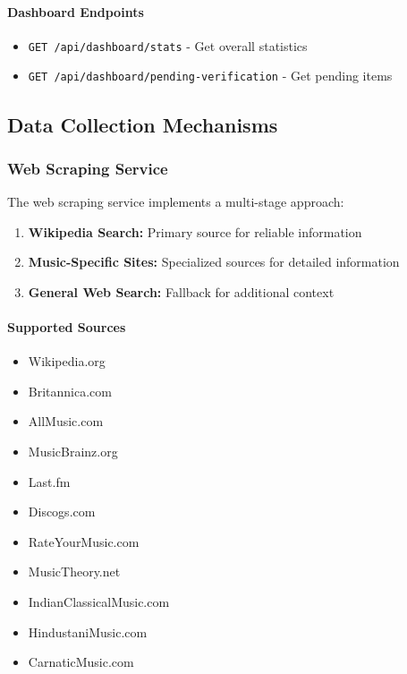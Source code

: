 \documentclass[12pt,a4paper]{article}
\begin{document}
\paragraph{Dashboard Endpoints}
\begin{itemize}
    \item \texttt{GET /api/dashboard/stats} - Get overall statistics
    \item \texttt{GET /api/dashboard/pending-verification} - Get pending items
\end{itemize}

\subsection{Data Collection Mechanisms}

\subsubsection{Web Scraping Service}

The web scraping service implements a multi-stage approach:

\begin{enumerate}
    \item \textbf{Wikipedia Search:} Primary source for reliable information
    \item \textbf{Music-Specific Sites:} Specialized sources for detailed information
    \item \textbf{General Web Search:} Fallback for additional context
\end{enumerate}

\paragraph{Supported Sources}
\begin{itemize}
    \item Wikipedia.org
    \item Britannica.com
    \item AllMusic.com
    \item MusicBrainz.org
    \item Last.fm
    \item Discogs.com
    \item RateYourMusic.com
    \item MusicTheory.net
    \item IndianClassicalMusic.com
    \item HindustaniMusic.com
    \item CarnaticMusic.com
\end{itemize}
\end{document}
